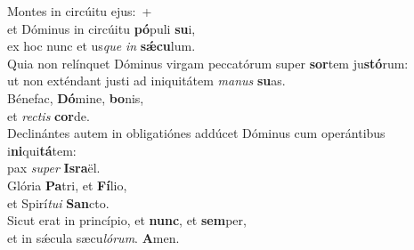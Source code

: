 \evenverse Montes in circúitu ejus:~+\\\evenverse  et Dóminus in circúitu \textbf{pó}puli \textbf{su}i,~\*\\
\evenverse ex hoc nunc et us\textit{que} \textit{in} \textbf{sǽ}\textbf{cu}lum.\\
\oddverse Quia non relínquet Dóminus virgam peccatórum super \textbf{sor}tem ju\textbf{stó}rum:~\*\\
\oddverse ut non exténdant justi ad iniquitátem \textit{ma}\textit{nus} \textbf{su}as.\\
\evenverse Bénefac, \textbf{Dó}mine, \textbf{bo}nis,~\*\\
\evenverse et \textit{re}\textit{ctis} \textbf{cor}de.\\
\oddverse Declinántes autem in obligatiónes addúcet Dóminus cum operántibus i\textbf{ni}qui\textbf{tá}tem:~\*\\
\oddverse pax \textit{su}\textit{per} \textbf{Is}\textbf{ra}ël.\\
\evenverse Glória \textbf{Pa}tri, et \textbf{Fí}lio,~\*\\
\evenverse et Spirí\textit{tu}\textit{i} \textbf{San}cto.\\
\oddverse Sicut erat in princípio, et \textbf{nunc}, et \textbf{sem}per,~\*\\
\oddverse et in sǽcula sæcu\textit{ló}\textit{rum}. \textbf{A}men.\\
